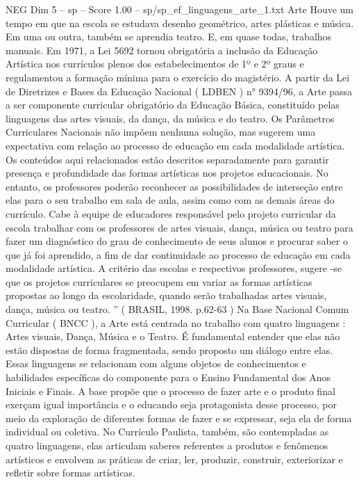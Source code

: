 \begin{textsample}{NEG Dim 5 – sp – Score 1.00 – sp/sp\_ef\_linguagens\_arte\_1.txt}  \label{ex:f5_neg_217}
Arte Houve um tempo em que na escola se estudava desenho geométrico, artes plásticas e música.
Em uma ou outra, também se aprendia teatro.
E, em quase todas, trabalhos manuais.
Em 1971, a Lei 5692 tornou obrigatória a inclusão da Educação Artística nos currículos plenos dos estabelecimentos de 1º e 2º graus e regulamentou a formação mínima para o exercício do magistério.
A partir da Lei de Diretrizes e Bases da Educação Nacional ( LDBEN ) n{\EmojiFont °} 9394/96, a Arte passa a ser componente curricular obrigatório da Educação Básica, constituído pelas linguagens das artes visuais, da dança, da música e do teatro.
Os Parâmetros Curriculares Nacionais não impõem nenhuma solução, mas sugerem uma expectativa com relação ao processo de educação em cada modalidade artística.
Os conteúdos aqui relacionados estão descritos separadamente para garantir presença e profundidade das formas artísticas nos projetos educacionais.
No entanto, os professores poderão reconhecer as possibilidades de interseção entre elas para o seu trabalho em sala de aula, assim como com as demais áreas do currículo.
Cabe à equipe de educadores responsável pelo projeto curricular da escola trabalhar com os professores de artes visuais, dança, música ou teatro para fazer um diagnóstico do grau de conhecimento de seus alunos e procurar saber o que já foi aprendido, a fim de dar continuidade ao processo de educação em cada modalidade artística.
A critério das escolas e respectivos professores, sugere -se que os projetos curriculares se preocupem em variar as formas artísticas propostas ao longo da escolaridade, quando serão trabalhadas artes visuais, dança, música ou teatro. ” ( BRASIL, 1998. p.62-63 ) Na Base Nacional Comum Curricular ( BNCC ), a Arte está centrada no trabalho com quatro linguagens : Artes visuais, Dança, Música e o Teatro.
É fundamental entender que elas não estão dispostas de forma fragmentada, sendo proposto um diálogo entre elas.
Essas linguagens se relacionam com alguns objetos de conhecimentos e habilidades específicas do componente para o Ensino Fundamental dos Anos Iniciais e Finais.
A base propõe que o processo de fazer arte e o produto final exerçam igual importância e o educando seja protagonista desse processo, por meio da exploração de diferentes formas de fazer e se expressar, seja ela de forma individual ou coletiva.
No Currículo Paulista, também, são contempladas as quatro linguagens, elas articulam saberes referentes a produtos e fenômenos artísticos e envolvem as práticas de criar, ler, produzir, construir, exteriorizar e refletir sobre formas artísticas.

\end{textsample}
